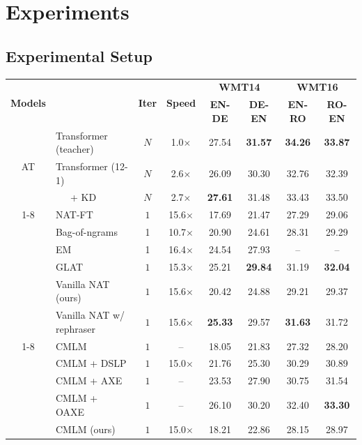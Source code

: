 \documentclass[letterpaper]{article} %
\begin{document}
\section{Experiments}
\subsection{Experimental Setup}
\begin{table}[th!]
\centering
\small
\begin{tabular}{clcccccc}
\toprule
 \multirow{2}{*}{\textbf{Models}} && \multirow{2}{*}{\textbf{Iter}} & \multirow{2}{*}{\textbf{Speed}} &
 \multicolumn{2}{c}{\textbf{WMT14}} & \multicolumn{2}{c}{\textbf{WMT16}} \\
  &&&&\textbf{EN-DE} & \textbf{DE-EN} & \textbf{EN-RO} & \textbf{RO-EN} \\
\midrule
\multirow{3}{*}{AT}
& Transformer (teacher) & $N$& 1.0$\times$&27.54&\bf{31.57}&\bf{34.26}&\bf{33.87} \\
& Transformer (12-1) &$N$& 2.6$\times$&  26.09&30.30&32.76&32.39  \\
& \ \ \ + KD &$N$& 2.7$\times$&  \bf{27.61}&31.48&33.43&33.50  \\
\cmidrule[0.6pt](lr){1-8}
\multirow{6}{*}{Vanilla NAT}
&NAT-FT \cite{gu2017non} &$1$&15.6$\times$&17.69 & 21.47 & 27.29 &  29.06 \\
&Bag-of-ngrams \cite{DBLP:conf/aaai/ShaoZFMZ20} &1&10.7$\times$&20.90 &24.61 &28.31 &29.29\\
&EM \cite{pmlr-v119-sun20c} & 1 & 16.4$\times$ & 24.54 & 27.93 & -- & --\\
&GLAT \cite{qian-etal-2021-glancing} &$1$&15.3$\times$&25.21&\bf{29.84}&31.19&\bf{32.04}\\
&Vanilla NAT (ours)&$1$&15.6$\times$&20.42 &24.88& 29.21& 29.37\\
&Vanilla NAT w/ rephraser &$1$&15.6$\times$& \bf{25.33}& 29.57& \bf{31.63}& 31.72\\
\cmidrule[0.6pt](lr){1-8}
\multirow{6}{*}{CMLM}
& CMLM \cite{ghazvininejad2019maskpredict} & $1$&--&18.05 & 21.83 & 27.32 & 28.20 \\
& CMLM + DSLP \cite{huang2022non} &$1$&15.0$\times$& 21.76 & 25.30 & 30.29 & 30.89 \\
& CMLM + AXE \cite{Aligned} &$1$&--& 23.53 & 27.90 & 30.75 & 31.54 \\
& CMLM + OAXE \cite{DBLP:conf/icml/DuTJ21} &$1$&--&26.10 & 30.20 & 32.40 & \bf{33.30}\\
& CMLM (ours) &$1$&15.0$\times$& 18.21& 22.86&28.15 &28.97 \\

\end{tabular}
\end{table}
\end{document}
